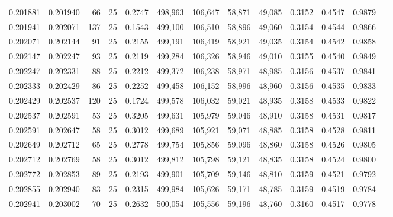 \begin{tabular}{rrrrrrrrrrrrr}
0.201881 & 0.201940 &    66 &  25 &                                     0.2747 & 498,963 & 106,647 &  58,871 &  49,085 & 0.3152 & 0.4547 & 0.9879 \\
0.201941 & 0.202071 &   137 &  25 &                                     0.1543 & 499,100 & 106,510 &  58,896 &  49,060 & 0.3154 & 0.4544 & 0.9866 \\
0.202071 & 0.202144 &    91 &  25 &                                     0.2155 & 499,191 & 106,419 &  58,921 &  49,035 & 0.3154 & 0.4542 & 0.9858 \\
0.202147 & 0.202247 &    93 &  25 &                                     0.2119 & 499,284 & 106,326 &  58,946 &  49,010 & 0.3155 & 0.4540 & 0.9849 \\
0.202247 & 0.202331 &    88 &  25 &                                     0.2212 & 499,372 & 106,238 &  58,971 &  48,985 & 0.3156 & 0.4537 & 0.9841 \\
0.202333 & 0.202429 &    86 &  25 &                                     0.2252 & 499,458 & 106,152 &  58,996 &  48,960 & 0.3156 & 0.4535 & 0.9833 \\
0.202429 & 0.202537 &   120 &  25 &                                     0.1724 & 499,578 & 106,032 &  59,021 &  48,935 & 0.3158 & 0.4533 & 0.9822 \\
0.202537 & 0.202591 &    53 &  25 &                                     0.3205 & 499,631 & 105,979 &  59,046 &  48,910 & 0.3158 & 0.4531 & 0.9817 \\
0.202591 & 0.202647 &    58 &  25 &                                     0.3012 & 499,689 & 105,921 &  59,071 &  48,885 & 0.3158 & 0.4528 & 0.9811 \\
0.202649 & 0.202712 &    65 &  25 &                                     0.2778 & 499,754 & 105,856 &  59,096 &  48,860 & 0.3158 & 0.4526 & 0.9805 \\
0.202712 & 0.202769 &    58 &  25 &                                     0.3012 & 499,812 & 105,798 &  59,121 &  48,835 & 0.3158 & 0.4524 & 0.9800 \\
0.202772 & 0.202853 &    89 &  25 &                                     0.2193 & 499,901 & 105,709 &  59,146 &  48,810 & 0.3159 & 0.4521 & 0.9792 \\
0.202855 & 0.202940 &    83 &  25 &                                     0.2315 & 499,984 & 105,626 &  59,171 &  48,785 & 0.3159 & 0.4519 & 0.9784 \\
0.202941 & 0.203002 &    70 &  25 &                                     0.2632 & 500,054 & 105,556 &  59,196 &  48,760 & 0.3160 & 0.4517 & 0.9778 \\

\end{tabular}
